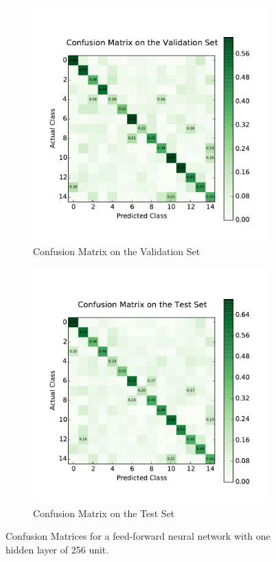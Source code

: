 \begin{figure}
	\centering
	\begin{subfigure}[b]{0.45\linewidth}
		\centering
		\includegraphics[width=\linewidth]{images/1/cm_valid.pdf}
		\caption{Confusion Matrix on the Validation Set}
	\end{subfigure}
	\hfill
	\begin{subfigure}[b]{0.45\linewidth}
		\centering
		\includegraphics[width=\linewidth]{images/1/cm_test.pdf}
		\caption{Confusion Matrix on the Test Set}
	\end{subfigure}
	\caption{Confusion Matrices for a feed-forward neural network with one hidden layer of 256 unit.}
	\label{shrine1_mat}
\end{figure}
